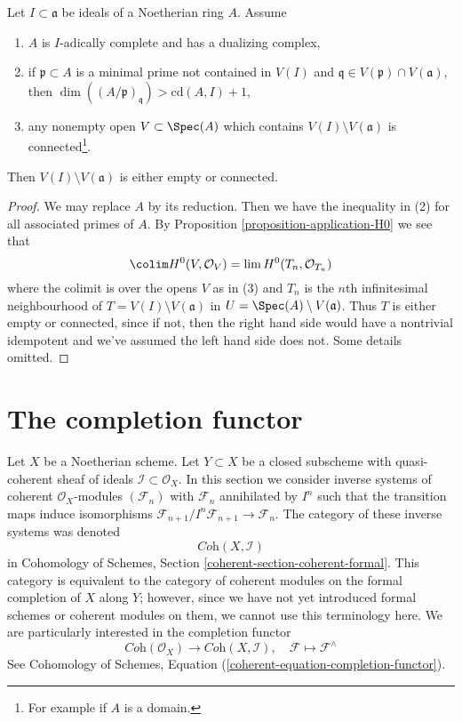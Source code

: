 \begin{lemma}
\label{lemma-connected}
Let $I \subset \mathfrak a$ be ideals of a Noetherian ring $A$.
Assume
\begin{enumerate}
\item $A$ is $I$-adically complete and has a dualizing complex,
\item if $\mathfrak p \subset A$ is a minimal prime not contained
in $V(I)$ and $\mathfrak q \in V(\mathfrak p) \cap V(\mathfrak a)$, then
$\dim((A/\mathfrak p)_\mathfrak q) > \text{cd}(A, I) + 1$,
\item any nonempty open $V \subset \Spec(A)$ which contains
$V(I) \setminus V(\mathfrak a)$ is connected\footnote{For example
if $A$ is a domain.}.
\end{enumerate}
Then $V(I) \setminus V(\mathfrak a)$ is either empty or connected.
\end{lemma}

\begin{proof}
We may replace $A$ by its reduction. Then we have the inequality
in (2) for all associated primes of $A$. By
Proposition \ref{proposition-application-H0} we see that
$$
\colim H^0(V, \mathcal{O}_V) = \lim H^0(T_n, \mathcal{O}_{T_n})
$$
where the colimit is over the opens $V$ as in (3) and $T_n$ is the
$n$th infinitesimal neighbourhood of $T = V(I) \setminus V(\mathfrak a)$
in $U = \Spec(A) \setminus V(\mathfrak a)$. Thus $T$ is either empty
or connected, since if not, then the right hand side would have a
nontrivial idempotent and we've assumed the left hand side does not.
Some details omitted.
\end{proof}






\section{The completion functor}
\label{section-completion}

\noindent
Let $X$ be a Noetherian scheme. Let $Y \subset X$ be a closed subscheme
with quasi-coherent sheaf of ideals $\mathcal{I} \subset \mathcal{O}_X$.
In this section we consider inverse systems of coherent
$\mathcal{O}_X$-modules $(\mathcal{F}_n)$ with $\mathcal{F}_n$
annihilated by $I^n$ such that the transition maps induce
isomorphisms $\mathcal{F}_{n + 1}/I^n\mathcal{F}_{n + 1} \to \mathcal{F}_n$.
The category of these inverse systems was denoted
$$
\textit{Coh}(X, \mathcal{I})
$$
in Cohomology of Schemes, Section \ref{coherent-section-coherent-formal}.
This category is equivalent to the category of coherent modules
on the formal completion of $X$ along $Y$; however, since we have
not yet introduced formal schemes or coherent modules on them,
we cannot use this terminology here. We are particularly interested
in the completion functor
$$
\textit{Coh}(\mathcal{O}_X)
\longrightarrow
\textit{Coh}(X, \mathcal{I}),\quad
\mathcal{F} \longmapsto \mathcal{F}^\wedge
$$
See
Cohomology of Schemes, Equation (\ref{coherent-equation-completion-functor}).

